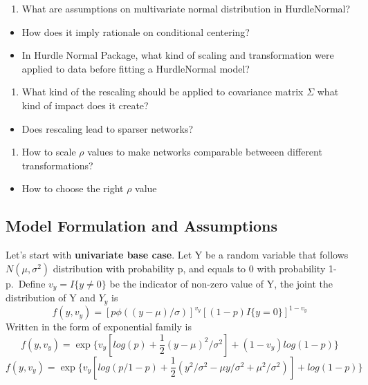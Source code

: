 \documentclass[
]{article}
\providecommand{\tightlist}{%
  \setlength{\itemsep}{0pt}\setlength{\parskip}{0pt}}
\begin{document}
\begin{enumerate}
\def\labelenumi{\arabic{enumi}.}
\tightlist
\item
  What are assumptions on multivariate normal distribution in
  HurdleNormal?
\end{enumerate}

\begin{itemize}
\tightlist
\item
  How does it imply rationale on conditional centering?
\item
  In Hurdle Normal Package, what kind of scaling and transformation were
  applied to data before fitting a HurdleNormal model?
\end{itemize}

\begin{enumerate}
\def\labelenumi{\arabic{enumi}.}
\setcounter{enumi}{1}
\tightlist
\item
  What kind of the rescaling should be applied to covariance matrix
  \(\Sigma\) what kind of impact does it create?
\end{enumerate}

\begin{itemize}
\tightlist
\item
  Does rescaling lead to sparser networks?
\end{itemize}

\begin{enumerate}
\def\labelenumi{\arabic{enumi}.}
\setcounter{enumi}{2}
\tightlist
\item
  How to scale \(\rho\) values to make networks comparable betweeen
  different transformations?
\end{enumerate}

\begin{itemize}
\tightlist
\item
  How to choose the right \(\rho\) value
\end{itemize}

\hypertarget{model-formulation-and-assumptions}{%
\subsection{Model Formulation and
Assumptions}\label{model-formulation-and-assumptions}}

Let's start with \textbf{univariate base case}. Let Y be a random
variable that follows \(N(\mu, \sigma^2)\) distribution with probability
p, and equals to 0 with probability 1-p.~Define \(v_y = I\{y \neq 0\}\)
be the indicator of non-zero value of Y, the joint the distribution of Y
and \(Y_y\) is \[
f(y, v_y) = [p \phi((y - \mu)/\sigma)]^{v_y} [(1 - p) I\{ y = 0\}]^{1-v_y}
\] Written in the form of exponential family is \[
f(y, v_y) = \exp\{v_y [log(p) + \frac{1}{2} (y - \mu)^2/\sigma^2] + (1 - v_y)log(1-p) \}
\] \[
f(y, v_y) = \exp\{v_y [log(p / 1-p) + \frac{1}{2}(y^2/\sigma^2 - \mu y/\sigma^2 + \mu^2/\sigma^2)] + log(1-p)\}
\]
\end{document}
